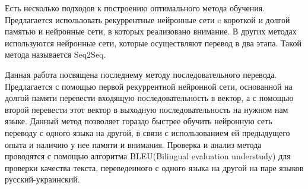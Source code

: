 \documentclass[12pt,twoside]{article}
\begin{document}
Есть несколько подходов к построению оптимального метода обучения. Предлагается использовать рекуррентные нейронные сети c короткой и долгой памятью и нейронные сети, в которых реализовано внимание. В других методах используются нейронные сети, которые осуществляют перевод в два этапа. Такой метода называется Seq2Seq.

Данная работа посвящена последнему методу последовательного перевода. Предлагается с помощью первой рекуррентной нейронной сети, основанной на долгой памяти перевести входящую последовательность в вектор, а с помощью второй перевести этот вектор в выходную последовательность на нужном нам языке. Данный метод позволяет
гораздо быстрее обучить нейронную сеть переводу с одного языка на другой, в связи с использованием ей предыдущего опыта и наличию у нее памяти и внимания. Проверка и анализ метода проводятся с помощью алгоритма BLEU(Bilingual evaluation understudy) для проверки качества текста, переведенного с одного языка на другой на паре языков русский-украинский.






\end{document}
